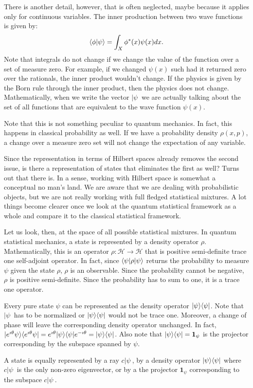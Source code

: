 There is another detail, however, that is often neglected, maybe because it applies only for continuous variables. The inner production between two wave functions is given by:
\begin{equation}
	\langle \phi | \psi \rangle = \int_X \phi^*(x) \psi(x) dx.
\end{equation}
Note that integrals do not change if we change the value of the function over a set of measure zero. For example, if we changed $\psi(x)$ such had it returned zero over the rationals, the inner product wouldn't change. If the physics is given by the Born rule through the inner product, then the physics does not change. Mathematically, when we write the vector $|\psi \>$ we are actually talking about the set of all functions that are equivalent to the wave function $\psi(x)$.

Note that this is not something peculiar to quantum mechanics. In fact, this happens in classical probability as well. If we have a probability density $\rho(x,p)$, a change over a measure zero set will not change the expectation of any variable.

Since the representation in terms of Hilbert spaces already removes the second issue, is there a representation of states that eliminates the first as well? Turns out that there is. In a sense, working with Hilbert space is somewhat a conceptual no man's land. We are aware that we are dealing with probabilistic objects, but we are not really working with full fledged statistical mixtures. A lot things become clearer once we look at the quantum statistical framework as a whole and compare it to the classical statistical framework.

Let us look, then, at the space of all possible statistical mixtures. In quantum statistical mechanics, a state is represented by a density operator $\rho$. Mathematically, this is an operator $\rho : \mathcal{H} \to \mathcal{H}$ that is positive semi-definite trace one self-adjoint operator. In fact, since $\langle \psi | \rho | \psi \rangle$ returns the probability to measure $\psi$ given the state $\rho$, $\rho$ is an observable. Since the probability cannot be negative, $\rho$ is positive semi-definite. Since the probability has to sum to one, it is a trace one operator.

Every pure state $\psi$ can be represented as the density operator $| \psi \rangle \langle \psi |$. Note that $|\psi\>$ has to be normalized or $| \psi \rangle \langle \psi |$ would not be trace one. Moreover, a change of phase will leave the corresponding density operator unchanged. In fact, $| e^{\imath \theta}  \psi \rangle \langle e^{\imath \theta}  \psi | = e^{\imath \theta} | \psi \rangle \langle \psi | e^{-\imath \theta} = | \psi \rangle \langle \psi |$. Also note that $| \psi \rangle \langle \psi | = \mathbf{1}_{\psi}$ is the projector corresponding by the subspace spanned by $\psi$.
\begin{insight}
	A state is equally represented by a ray $c|\psi\>$, by a density operator $| \psi \rangle \langle \psi |$ where $c|\psi\>$ is the only non-zero eigenvector, or by a the projector $\mathbf{1}_{\psi}$ corresponding to the subspace $c|\psi\>$.
\end{insight}


